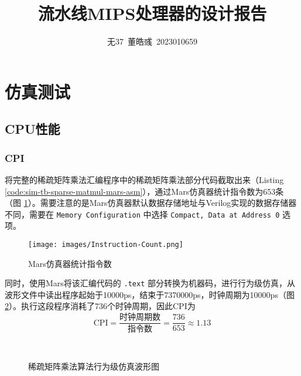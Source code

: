 \documentclass[utf8,twocolumn]{article}
\title{流水线MIPS处理器的设计报告}
\author{无37~董皓彧~2023010659}
\date{\zhtoday}
\begin{document}
\maketitle
\thispagestyle{fancy}


\section{仿真测试}

\subsection{CPU性能}

\subsubsection{CPI}
将完整的稀疏矩阵乘法汇编程序中的稀疏矩阵乘法部分代码截取出来（Listing \ref{code:sim-tb-sparse-matmul-mars-asm}），通过Mars仿真器统计指令数为653条（图 \ref{fig:instruction-count}）。需要注意的是Mars仿真器默认数据存储地址与Verilog实现的数据存储器不同，需要在 \lstinline|Memory Configuration| 中选择 \lstinline|Compact, Data at Address 0| 选项。
\begin{figure}[H]
    \centering
    \texttt{[image: images/Instruction-Count.png]}
    \vspace{-2em}
    \caption{Mars仿真器统计指令数}
    \vspace{-2em}
    \label{fig:instruction-count}
\end{figure}
同时，使用Mars将该汇编代码的 \lstinline|.text| 部分转换为机器码，进行行为级仿真，从波形文件中读出程序起始于10000ps，结束于7370000ps，时钟周期为10000ps（图 \ref{fig:simulation-time}）。执行这段程序消耗了736个时钟周期，因此CPI为
\begin{equation}
    \text{CPI} = \frac{\text{时钟周期数}}{\text{指令数}} = \frac{736}{653} \approx 1.13
\end{equation}
\begin{figure}[H]
    \centering
    \\
    \vspace{-1em}
    \caption{稀疏矩阵乘法算法行为级仿真波形图}
    \label{fig:simulation-time}
\end{figure}


\onecolumn
\appendix
% 
\end{document}
